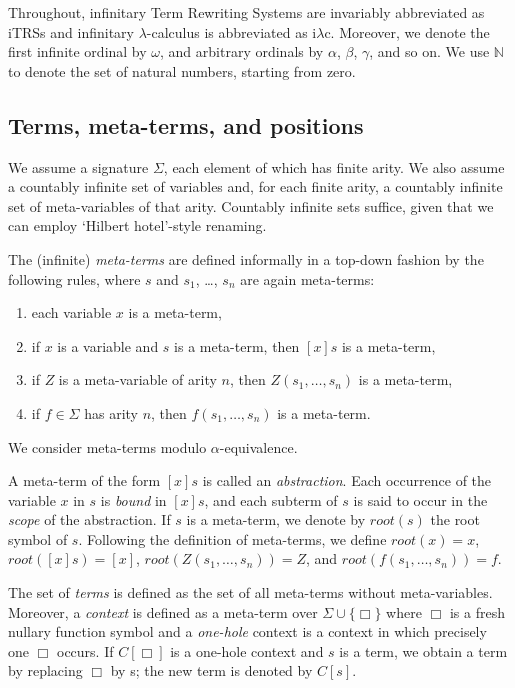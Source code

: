 \documentclass{LMCS}
\theoremstyle{plain}
\theoremstyle{definition}
\newcommand{\rs}[1]{root(#1)}
\newcommand{\natnum}{\mathbb{N}}
\newcommand{\iLC}{i$\lambda$c\xspace}
\begin{document}
Throughout, infinitary Term Rewriting Systems are invariably abbreviated as iTRSs and infinitary $\lambda$-calculus is abbreviated as \iLC. Moreover, we denote the first infinite ordinal by $\omega$, and arbitrary ordinals by $\alpha$, $\beta$, $\gamma$, and so on. We use $\natnum$ to denote the set of natural numbers, starting from zero.

\subsection{Terms, meta-terms, and positions}

We assume a signature $\Sigma$, each element of which has finite arity. We also assume a countably infinite set of variables and, for each finite arity, a countably infinite set of meta-variables of that arity. Countably infinite sets suffice, given that we can employ `Hilbert hotel'-style renaming. 

The (infinite) \emph{meta-terms} are defined informally in a top-down fashion by the following rules, where $s$ and $s_1$, \ldots, $s_n$ are again meta-terms:
\begin{enumerate}[(1)]
\item
each variable $x$ is a meta-term,
\item
if $x$ is a variable and $s$ is a meta-term, then $[x] s$ is a meta-term,
\item
if $Z$ is a meta-variable of arity $n$, then $Z(s_1, \ldots, s_n)$ is a meta-term,
\item
if $f \in \Sigma$ has arity $n$, then $f(s_1, \ldots, s_n)$ is a meta-term.
\end{enumerate}

\noindent We consider meta-terms modulo $\alpha$-equivalence.

A meta-term of the form $[x] s$ is called an
\emph{abstraction}. Each occurrence of the variable $x$ in $s$ is
\emph{bound} in $[x]s$, and each subterm of $s$ is said to occur in the
\emph{scope} of the abstraction. If $s$ is a meta-term, we denote by $\rs{s}$ the root symbol of $s$. Following the definition of meta-terms, we define $\rs{x} = x$, $\rs{[x]s} = [x]$, $\rs{Z(s_1, \ldots, s_n)} = Z$, and $\rs{f(s_1, \ldots, s_n)} = f$.

The set of \emph{terms} is defined as the set of all meta-terms without meta-variables. Moreover, a \emph{context} is defined as a meta-term over $\Sigma \cup \{ \Box \}$ where $\Box$ is a fresh nullary function symbol and a \emph{one-hole} context is a context in which precisely one $\Box$ occurs. If $C[\Box]$ is a one-hole context and $s$ is a term, we obtain a term by replacing $\Box$ by s; the new term is denoted by $C[s]$.
\end{document}
